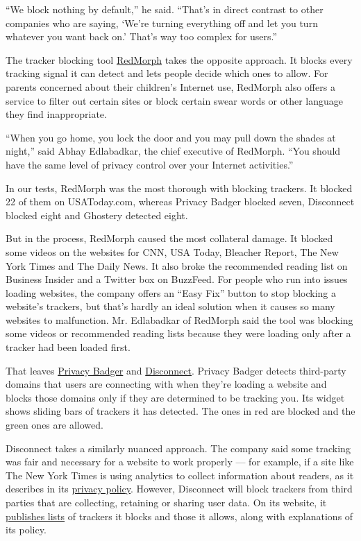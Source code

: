 ``We block nothing by default,'' he said. ``That's in direct contrast to
other companies who are saying, `We're turning everything off and let
you turn whatever you want back on.' That's way too complex for users.''

The tracker blocking tool \href{https://redmorph.com/}{RedMorph} takes
the opposite approach. It blocks every tracking signal it can detect and
lets people decide which ones to allow. For parents concerned about
their children's Internet use, RedMorph also offers a service to filter
out certain sites or block certain swear words or other language they
find inappropriate.

``When you go home, you lock the door and you may pull down the shades
at night,'' said Abhay Edlabadkar, the chief executive of RedMorph.
``You should have the same level of privacy control over your Internet
activities.''

In our tests, RedMorph was the most thorough with blocking trackers. It
blocked 22 of them on USAToday.com, whereas Privacy Badger blocked
seven, Disconnect blocked eight and Ghostery detected eight.

But in the process, RedMorph caused the most collateral damage. It
blocked some videos on the websites for CNN, USA Today, Bleacher Report,
The New York Times and The Daily News. It also broke the recommended
reading list on Business Insider and a Twitter box on BuzzFeed. For
people who run into issues loading websites, the company offers an
``Easy Fix'' button to stop blocking a website's trackers, but that's
hardly an ideal solution when it causes so many websites to malfunction.
Mr. Edlabadkar of RedMorph said the tool was blocking some videos or
recommended reading lists because they were loading only after a tracker
had been loaded first.

That leaves \href{https://www.eff.org/privacybadger}{Privacy Badger} and
\href{https://disconnect.me/}{Disconnect}. Privacy Badger detects
third-party domains that users are connecting with when they're loading
a website and blocks those domains only if they are determined to be
tracking you. Its widget shows sliding bars of trackers it has detected.
The ones in red are blocked and the green ones are allowed.

Disconnect takes a similarly nuanced approach. The company said some
tracking was fair and necessary for a website to work properly --- for
example, if a site like The New York Times is using analytics to collect
information about readers, as it describes in its
\href{http://www.nytimes3xbfgragh.onion/content/help/rights/privacy/policy/privacy-policy.html}{privacy
policy}. However, Disconnect will block trackers from third parties that
are collecting, retaining or sharing user data. On its website, it
\href{https://disconnect.me/trackerprotection\#trackers-we-block}{publishes
lists} of trackers it blocks and those it allows, along with
explanations of its policy.


